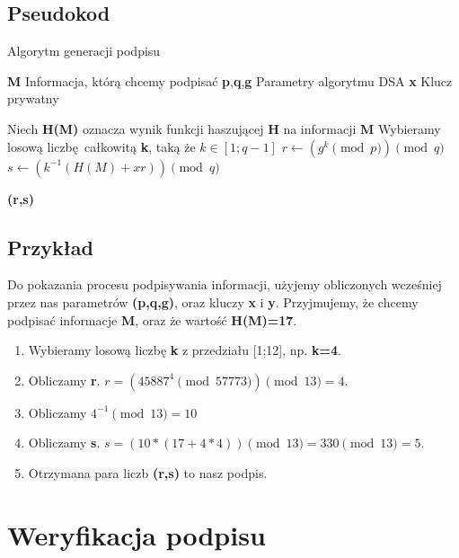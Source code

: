 \documentclass[11pt]{article}
\begin{document}
\subsection{Pseudokod}
\begin{algorithm}
\caption{Algorytm generacji podpisu}\label{alg:cap}
  \begin{algorithmic}[1]
    \Require \textbf{M}
    \Comment Informacja, którą chcemy podpisać
    \Require \textbf{p},\textbf{q},\textbf{g}
    \Comment Parametry algorytmu DSA
    \Require \textbf{x}
    \Comment Klucz prywatny

    \State Niech \textbf{H(M)} oznacza wynik funkcji haszującej \textbf{H} na
      informacji \textbf{M}
    \Repeat
      \State Wybieramy losową liczbę całkowitą \textbf{k}, taką że $k \in [1;q-1]$
      \State $r \gets (g^{k} \pmod p) \pmod q$
      \State $s \gets (k^{-1}(H(M) + xr)) \pmod q$

    \State \Return \textbf{(r,s)}
  \end{algorithmic}
\end{algorithm}

\subsection{Przykład}
Do pokazania procesu podpisywania informacji, użyjemy obliczonych wcześniej
przez nas parametrów \textbf{(p,q,g)}, oraz kluczy \textbf{x} i \textbf{y}.
Przyjmujemy, że chcemy podpisać informacje \textbf{M}, oraz że wartość
\textbf{H(M)=17}.

\begin{enumerate}
  \item Wybieramy losową liczbę \textbf{k} z przedziału [1;12], np. \textbf{k=4}.
  \item Obliczamy \textbf{r}. $r=(45887^{4} \pmod 57773) \pmod 13 = 4$.
  \item Obliczamy $4^{-1} \pmod 13 = 10$
  \item Obliczamy \textbf{s}. $s= (10 * (17 + 4 * 4)) \pmod 13 = 330 \pmod 13 = 5$.
  \item Otrzymana para liczb \textbf{(r,s)} to nasz podpis.
\end{enumerate}

\pagebreak

\section{Weryfikacja podpisu}
\end{document}
